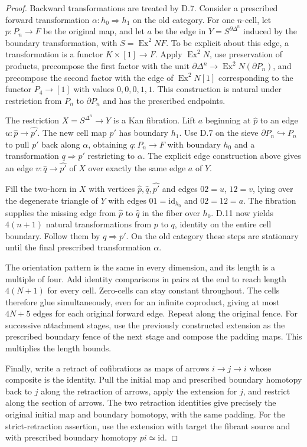 \begin{proof}
Backward transformations are treated by D.7. Consider a prescribed forward transformation $\alpha:h_0\Rightarrow h_1$ on the old category. For one $n$-cell, let $p:P_n\to F$ be the original map, and let $a$ be the edge in
$Y=S^{\partial\Delta^n}$ induced by the boundary transformation, with $S=\operatorname{Ex}^2 NF$. To be explicit about this edge, a transformation is a functor $K\times[1]\to F$. Apply $\operatorname{Ex}^2N$, use preservation of products, precompose the first factor with the unit $\partial\Delta^n\to\operatorname{Ex}^2N(\partial P_n)$, and precompose the second factor with the edge of $\operatorname{Ex}^2N[1]$ corresponding to the functor $P_4\to[1]$ with values $0,0,0,1,1$. This construction is natural under restriction from $P_n$ to $\partial P_n$ and has the prescribed endpoints.

The restriction $X=S^{\Delta^n}\to Y$ is a Kan fibration. Lift $a$ beginning at $\widehat p$ to an edge $u:\widehat p\to\widehat {p'}$. The new cell map $p'$ has boundary $h_1$. Use D.7 on the sieve $\partial P_n\hookrightarrow P_n$ to pull $p'$ back along $\alpha$, obtaining $q:P_n\to F$ with boundary $h_0$ and a transformation $q\Rightarrow p'$ restricting to $\alpha$. The explicit edge construction above gives an edge $v:\widehat q\to\widehat {p'}$ of $X$ over exactly the same edge $a$ of $Y$.

Fill the two-horn in $X$ with vertices $\widehat p,\widehat q,\widehat {p'}$ and edges $02=u$, $12=v$, lying over the degenerate triangle of $Y$ with edges $01=\mathrm{id}_{h_0}$ and $02=12=a$. The fibration supplies the missing edge from $\widehat p$ to $\widehat q$ in the fiber over $h_0$. D.11 now yields $4(n+1)$ natural transformations from $p$ to $q$, identity on the entire cell boundary. Follow them by $q\Rightarrow p'$. On the old category these steps are stationary until the final prescribed transformation $\alpha$.

The orientation pattern is the same in every dimension, and its length is a multiple of four. Add identity comparisons in pairs at the end to reach length $4(N+1)$ for every cell. Zero-cells can stay constant throughout. The cells therefore glue simultaneously, even for an infinite coproduct, giving at most $4N+5$ edges for each original forward edge. Repeat along the original fence. For successive attachment stages, use the previously constructed extension as the prescribed boundary fence of the next stage and compose the padding maps. This multiplies the length bounds.

Finally, write a retract of cofibrations as maps of arrows $i\to j\to i$ whose composite is the identity. Pull the initial map and prescribed boundary homotopy back to $j$ along the retraction of arrows, apply the extension for $j$, and restrict along the section of arrows. The two retraction identities give precisely the original initial map and boundary homotopy, with the same padding. For the strict-retraction assertion, use the extension with target the fibrant source and with prescribed boundary homotopy $pi\simeq\mathrm{id}$.
\end{proof}


